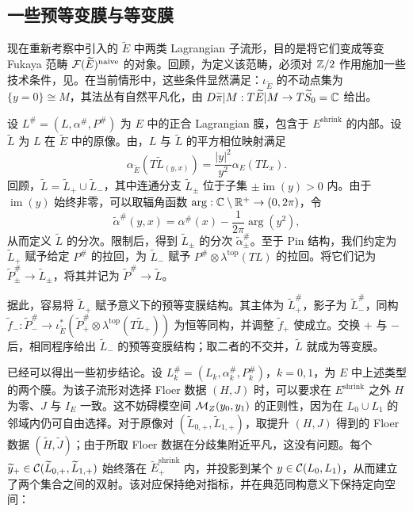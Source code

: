 \subsection{一些预等变膜与等变膜}\label{sec:18e}
现在重新考察中引入的 $\widetilde E$ 中两类 Lagrangian 子流形，目的是将它们变成等变 Fukaya 范畴 $\mathcal F(\widetilde E)^{\mathrm{naive}}$ 的对象。回顾，为定义该范畴，必须对 $\mathbb Z/2$ 作用施加一些技术条件，见。在当前情形中，这些条件显然满足：$\iota_{\widetilde E}$ 的不动点集为 $\{y=0\}\cong M$，其法丛有自然平凡化，由 $D\widetilde\pi|M:T\widetilde E|M\to T\widetilde S_0=\mathbb C$ 给出。

\begin{description}[leftmargin=2em]
\item[(U) 型。]\mbox{}\par 设 $L^\#=(L,\alpha^\#,P^\#)$ 为 $E$ 中的正合 Lagrangian 膜，包含于 $E^{\mathrm{shrink}}$ 的内部。设 $\widetilde L$ 为 $L$ 在 $\widetilde E$ 中的原像。由，$L$ 与 $\widetilde L$ 的平方相位映射满足
\[
\alpha_{\widetilde E}(T\widetilde L_{(y,x)})=\frac{|y|^2}{y^2}\alpha_E(TL_x).
\]
回顾，$\widetilde L=\widetilde L_+\cup\widetilde L_-$，其中连通分支 $\widetilde L_\pm$ 位于子集 $\pm\operatorname{im}(y)>0$ 内。由于 $\operatorname{im}(y)$ 始终非零，可以取辐角函数 $\arg:\mathbb C\setminus\mathbb R^+\to(0,2\pi)$，令
\begin{equation}\label{eq:18.18}
\widetilde\alpha^\#(y,x)=\alpha^\#(x)-\frac1{2\pi}\arg(y^2),
\end{equation}
从而定义 $\widetilde L$ 的分次。限制后，得到 $\widetilde L_\pm$ 的分次 $\widetilde\alpha^\#_\pm$。至于 Pin 结构，我们约定为 $\widetilde L_+$ 赋予给定 $P^\#$ 的拉回，为 $\widetilde L_-$ 赋予 $P^\#\otimes\lambda^{\mathrm{top}}(TL)$ 的拉回。将它们记为 $\widetilde P_\pm^\#\to\widetilde L_\pm$，将其并记为 $\widetilde P^\#\to\widetilde L$。

据此，容易将 $\widetilde L_+$ 赋予意义下的预等变膜结构。其主体为 $\widetilde L_+^\#$，影子为 $\widetilde L_-^\#$，同构 $\widetilde f_-:\widetilde P_-^\#\to\iota_{\widetilde E}^*(\widetilde P_+^\#\otimes\lambda^{\mathrm{top}}(T\widetilde L_+))$ 为恒等同构，并调整 $\widetilde f_+$ 使成立。交换 $+$ 与 $-$ 后，相同程序给出 $\widetilde L_-$ 的预等变膜结构；取二者的不交并，$\widetilde L$ 就成为等变膜。
\end{description}
已经可以得出一些初步结论。设 $L_k^\#=(L_k,\alpha_k^\#,P_k^\#)$，$k=0,1$，为 $E$ 中上述类型的两个膜。为该子流形对选择 Floer 数据 $(H,J)$ 时，可以要求在 $E^{\mathrm{shrink}}$ 之外 $H$ 为零、$J$ 与 $I_E$ 一致。这不妨碍模空间 $\mathcal M_Z(y_0,y_1)$ 的正则性，因为在 $L_0\cup L_1$ 的邻域内仍可自由选择。对于原像对 $(\widetilde L_{0,+},\widetilde L_{1,+})$，取提升 $(H,J)$ 得到的 Floer 数据 $(\widetilde H,\widetilde J)$；由于所取 Floer 数据在分歧集附近平凡，这没有问题。每个 $\widetilde y_+\in\mathcal C(\widetilde L_{0,+},\widetilde L_{1,+})$ 始终落在 $\widetilde E^{\mathrm{shrink}}_+$ 内，并投影到某个 $y\in\mathcal C(L_0,L_1)$，从而建立了两个集合之间的双射。该对应保持绝对指标，并在典范同构意义下保持定向空间：
